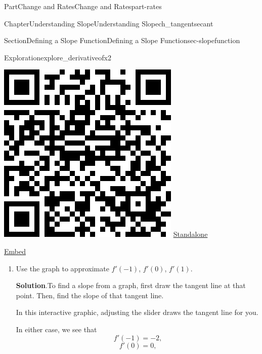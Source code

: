 \documentclass{tufte-book}
\newcommand{\blocktitlefont}{\relax}
\numberwithin{equation}{chapter}
\begin{document}
\begin{partptx}{Part}{Change and Rates}{}{Change and Rates}{}{}{part-rates}
\begin{chapterptx}{Chapter}{Understanding Slope}{}{Understanding Slope}{}{}{ch_tangentsecant}
\begin{sectionptx}{Section}{Defining a Slope Function}{}{Defining a Slope Function}{}{}{sec-slopefunction}
\begin{exploration}{Exploration}{}{explore_derivativeofx2}
\begin{sidebyside}{2}{0.075}{0.075}{0.17}
\begin{sbspanel}{0.21}
\includegraphics[width=\linewidth]{generated/qrcode/explore_derivativeofx2-1-1-2.png}
\href{http://webwork.bridgew.edu/oer/functions_at_work/explore_derivativeofx2-1-1-2.html}{Standalone}%
\par
\href{http://webwork.bridgew.edu/oer/functions_at_work/explore_derivativeofx2-1-1-2-if.html}{Embed}%
\end{sbspanel}%
\end{sidebyside}%
%
\begin{enumerate}[font=\bfseries,label=(\alph*),ref=\alph*]%
\item{}Use the graph to approximate \(f'(-1)\), \(f'(0)\), \(f'(1)\).%
\par\smallskip%
\noindent\textbf{\blocktitlefont Solution}.\hypertarget{explore_derivativeofx2-2-2}{}\quad{}To find a slope from a graph, first draw the tangent line at that point. Then, find the slope of that tangent line.%
\par
In this interactive graphic, adjusting the slider draws the tangent line for you.%
\par
In either case, we see that%
\begin{equation*}
f'(-1) = -2\text{,}
\end{equation*}
%
\begin{equation*}
f'(0)=0\text{,}
\end{equation*}

\end{enumerate}
\end{exploration}
\end{sectionptx}
\end{chapterptx}
\end{partptx}
\end{document}
